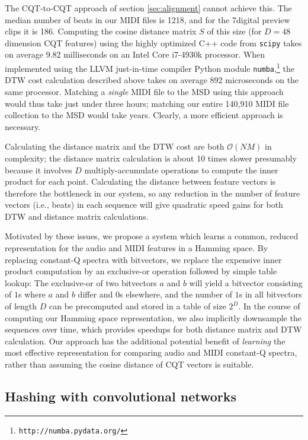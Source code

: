 \documentclass{article}
\begin{document}
The CQT-to-CQT approach of section \ref{sec:alignment} cannot achieve this.
The median number of beats in our MIDI files is 1218, and for the 7digital preview clips it is 186.
Computing the cosine distance matrix $S$ of this size (for $D=48$ dimension CQT features) using the highly optimized C++ code from \texttt{scipy} \cite{jones2014scipy} takes on average 9.82 milliseconds on an Intel Core i7-4930k processor.
When implemented using the LLVM just-in-time compiler Python module \texttt{numba},\footnote{\texttt{http://numba.pydata.org/}} the DTW cost calculation described above takes on average 892 microseconds on the same processor.
Matching a \textit{single} MIDI file to the MSD using this approach would thus take just under three hours; matching our entire 140,910 MIDI file collection to the MSD would take years.
Clearly, a more efficient approach is necessary.

Calculating the distance matrix and the DTW cost are both $\mathcal{O}(NM)$ in complexity; the distance matrix calculation is about 10 times slower presumably because it involves $D$ multiply-accumulate operations to compute the inner product for each point.
Calculating the distance between feature vectors is therefore the bottleneck in our system, so any reduction in the number of feature vectors (i.e., beats) in each sequence will give quadratic speed gains for both DTW and distance matrix calculations.

Motivated by these issues, we propose a system which learns a common, reduced representation for the audio and MIDI features in a Hamming space.
By replacing constant-Q spectra with bitvectors, we replace the expensive inner product computation by an exclusive-or operation followed by simple table lookup: The exclusive-or of two bitvectors $a$ and $b$ will yield a bitvector consisting of $1$s where $a$ and $b$ differ and $0$s elsewhere, and the number of $1$s in all bitvectors of length $D$ can be precomputed and stored in a table of size $2^D$.  
In the course of computing our Hamming space representation, we also implicitly downsample the sequences over time, which provides speedups for both distance matrix and DTW calculation.
Our approach has the additional potential benefit of {\em learning} the most effective representation for comparing audio and MIDI constant-Q spectra, rather than assuming the cosine distance of CQT vectors is suitable.

\subsection{Hashing with convolutional networks}
\end{document}
